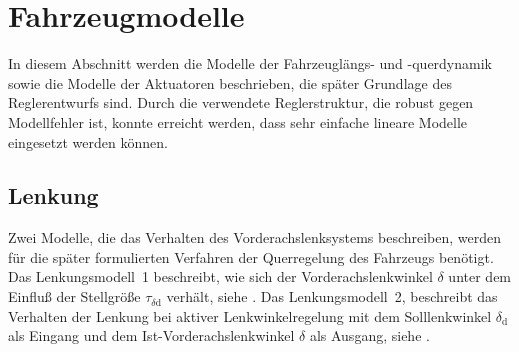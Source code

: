 \section{Fahrzeugmodelle}
\label{ch_Modellierung}
In diesem Abschnitt werden die Modelle der Fahrzeuglängs- und -querdynamik sowie die Modelle der  Aktuatoren beschrieben, die später Grundlage des Reglerentwurfs sind. Durch die verwendete Reglerstruktur, die robust gegen Modellfehler ist, konnte erreicht werden, dass sehr einfache lineare Modelle eingesetzt werden können.


\subsection{Lenkung}\label{subS:SteeringModels}
Zwei Modelle, die das Verhalten des Vorderachslenksystems beschreiben, werden für die später formulierten Verfahren der Querregelung des Fahrzeugs benötigt.
Das Lenkungsmodell~1 beschreibt, wie sich der Vorderachslenkwinkel $\delta$ unter dem Einfluß der Stellgröße $\tau_{\delta\mathrm{d}}$ verhält, siehe . 
Das Lenkungsmodell~2, beschreibt das Verhalten der Lenkung bei aktiver Lenkwinkelregelung mit dem Solllenkwinkel $\delta_\mathrm{d}$ als Eingang und dem Ist-Vorderachslenkwinkel 
$\delta$ als Ausgang, siehe .

